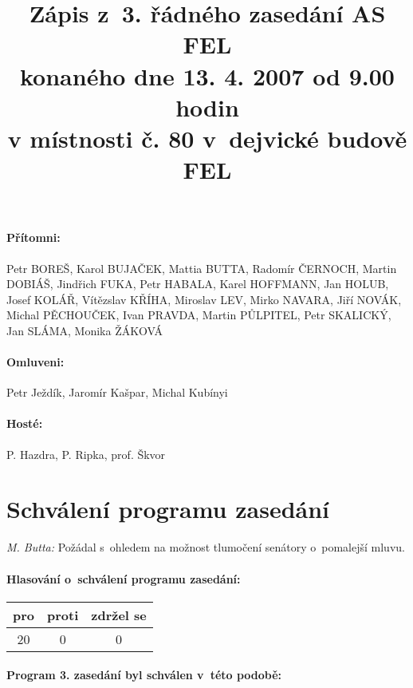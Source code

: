 \documentclass[a4paper,12pt,notitlepage,oneside]{article}
\title{\textbf{Zápis z~3. řádného zasedání AS FEL}\\konaného dne 13. 4. 2007 od 9.00 hodin\\v místnosti č. 80 v~dejvické budově FEL}
\author{}\date{}
\newcommand{\hlasovani}[3]{\begin{center}
\begin{tabular}{|c|c|c|}\hline
pro& proti & zdržel se \\ \hline
#1 & #2 & #3 \\ \hline
\end{tabular}
\end{center}}
\begin{document}
\maketitle

\paragraph{Přítomni:} Petr BOREŠ, Karol BUJAČEK, Mattia BUTTA, Radomír ČERNOCH, Martin DOBIÁŠ, Jindřich FUKA, Petr HABALA, Karel HOFFMANN, Jan HOLUB, Josef KOLÁŘ, Vítězslav KŘÍHA, Miroslav LEV, Mirko NAVARA, Jiří NOVÁK, Michal PĚCHOUČEK, Ivan PRAVDA, Martin PŮLPITEL, Petr SKALICKÝ, Jan SLÁMA, Monika ŽÁKOVÁ
\paragraph{Omluveni:} Petr Ježdík, Jaromír Kašpar, Michal Kubínyi

\paragraph{Hosté:} P. Hazdra, P. Ripka, prof. Škvor



\section{Schválení programu zasedání}
\textit{M. Butta:} Požádal s~ohledem na možnost tlumočení senátory o~pomalejší mluvu.

\paragraph{Hlasování o~schválení programu zasedání:}
\hlasovani{20}{0}{0}

\paragraph{Program 3. zasedání byl schválen v~této podobě:}
\end{document}
